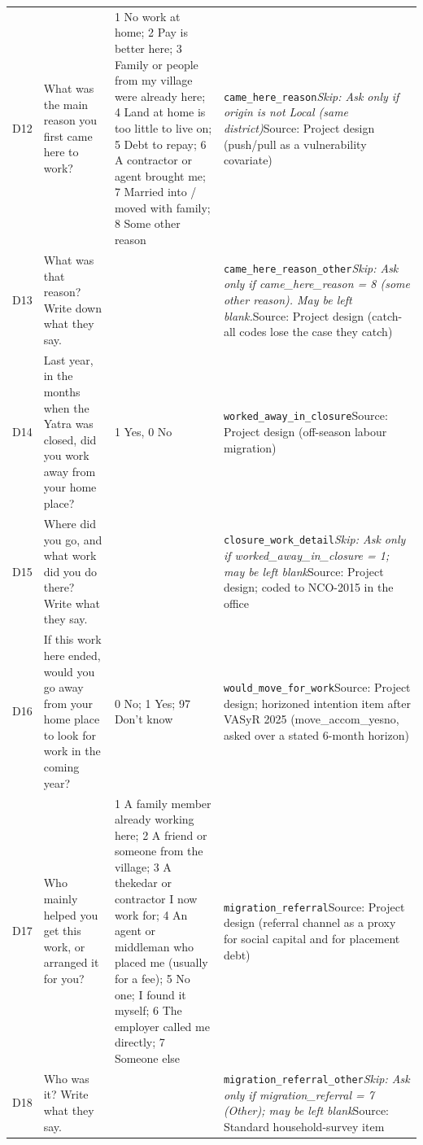 \documentclass[10pt]{article}
\begin{document}
{\begin{longtable}{p{0.8cm}p{6.4cm}p{3.6cm}p{5.8cm}}
D12 & What was the main reason you first came here to work? & 1 No work at home; 2 Pay is better here; 3 Family or people from my village were already here; 4 Land at home is too little to live on; 5 Debt to repay; 6 A contractor or agent brought me; 7 Married into / moved with family; 8 Some other reason & \texttt{came\_here\_reason}\newline \textit{Skip: Ask only if origin is not Local (same district)}\newline Source: Project design (push/pull as a vulnerability covariate) \\
D13 & What was that reason? Write down what they say. &  & \texttt{came\_here\_reason\_other}\newline \textit{Skip: Ask only if came\_here\_reason = 8 (some other reason). May be left blank.}\newline Source: Project design (catch-all codes lose the case they catch) \\
D14 & Last year, in the months when the Yatra was closed, did you work away from your home place? & 1 Yes, 0 No & \texttt{worked\_away\_in\_closure}\newline Source: Project design (off-season labour migration) \\
D15 & Where did you go, and what work did you do there? Write what they say. &  & \texttt{closure\_work\_detail}\newline \textit{Skip: Ask only if worked\_away\_in\_closure = 1; may be left blank}\newline Source: Project design; coded to NCO-2015 in the office \\
D16 & If this work here ended, would you go away from your home place to look for work in the coming year? & 0 No; 1 Yes; 97 Don't know & \texttt{would\_move\_for\_work}\newline Source: Project design; horizoned intention item after VASyR 2025 (move\_accom\_yesno, asked over a stated 6-month horizon) \\
D17 & Who mainly helped you get this work, or arranged it for you? & 1 A family member already working here; 2 A friend or someone from the village; 3 A thekedar or contractor I now work for; 4 An agent or middleman who placed me (usually for a fee); 5 No one; I found it myself; 6 The employer called me directly; 7 Someone else & \texttt{migration\_referral}\newline Source: Project design (referral channel as a proxy for social capital and for placement debt) \\
D18 & Who was it? Write what they say. &  & \texttt{migration\_referral\_other}\newline \textit{Skip: Ask only if migration\_referral = 7 (Other); may be left blank}\newline Source: Standard household-survey item \\
\bottomrule
\end{longtable}
}
\end{document}
